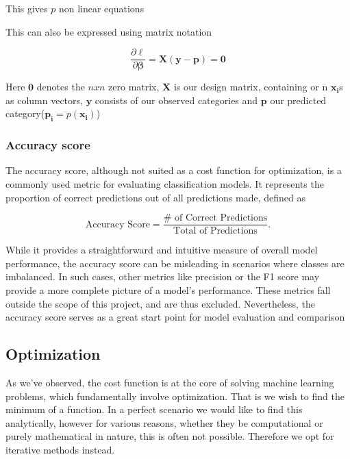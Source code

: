 \documentclass{article}
\theoremstyle{definition}
\begin{document}
This gives $p$ non linear equations

This can also be expressed using matrix notation

\[
\frac{\partial \ell }{\partial \boldsymbol{\beta}}  = \boldsymbol{X} (\boldsymbol{y} - \boldsymbol{p}) = \boldsymbol{0}
\]

Here $\boldsymbol{0}$ denotes the $nxn$ zero matrix, $\mathbf{X}$ is our design matrix, containing or n $\boldsymbol{x_i}$s as column vectors, $\boldsymbol{y}$ consists of our observed categories and $\boldsymbol{p}$ our predicted category($\boldsymbol{p_i} = p(\boldsymbol{x_i})$)





\subsubsection{Accuracy score}

The accuracy score, although not suited as a cost function for optimization, is a commonly used metric for evaluating classification models. It represents the proportion of correct predictions out of all predictions made, defined as

\begin{equation*}
    \text{Accuracy Score} = \frac{ \# \text{ of Correct Predictions}}{\text{Total} \text{ of Predictions}}.
\end{equation*}

While it provides a straightforward and intuitive measure of overall model performance, the accuracy score can be misleading in scenarios where classes are imbalanced. In such cases, other metrics like precision or the F1 score may provide a more complete picture of a model's performance. These metrics fall outside the scope of this project, and are thus excluded. Nevertheless, the accuracy score serves as a great start point for model evaluation and comparison

\subsection{Optimization}
As we've observed, the cost function is at the core of solving machine learning problems, which fundamentally involve optimization. That is we wish to find the minimum of a function. In a perfect scenario we would like to find this analytically, however for various reasons, whether they be computational or purely mathematical in nature, this is often not possible. Therefore we opt for iterative methods instead.
\end{document}

